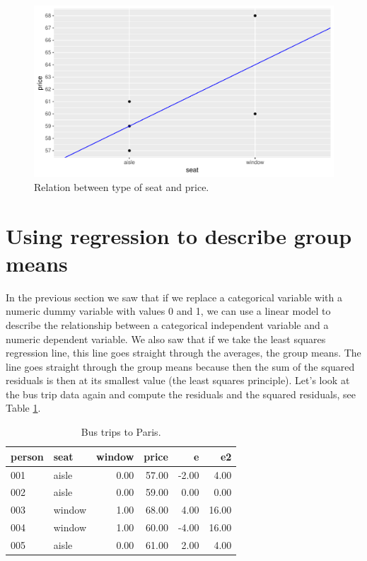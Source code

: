 \documentclass[]{report}\usepackage[]{graphicx}\usepackage[]{color}
\makeatletter
\def\maxwidth{ %
  \ifdim\Gin@nat@width>\linewidth
    \linewidth
  \else
    \Gin@nat@width
  \fi
}
\newenvironment{knitrout}{}{} %
\makeatother
\begin{document}
\begin{knitrout}
\color{fgcolor}\begin{figure}

{\centering \includegraphics[width=\maxwidth]{figure/dummy_4-1} 

}

\caption[Relation between type of seat and price]{Relation between type of seat and price.}\label{fig:dummy_4}
\end{figure}


\end{knitrout}



\section{Using regression to describe group means}

In the previous section we saw that if we replace a categorical variable with a numeric dummy variable with values 0 and 1, we can use a linear model to describe the relationship between a categorical independent variable and a numeric dependent variable. We also saw that if we take the least squares regression line, this line goes straight through the averages, the group means. The line goes straight through the group means because then the sum of the squared residuals is then at its smallest value (the least squares principle).  Let's look at the bus trip data again and compute the residuals and the squared residuals, see Table \ref{tab:dummy_5}.

\begin{table}[ht]
\centering
\caption{Bus trips to Paris.} 
\label{tab:dummy_5}
\begin{tabular}{llrrrr}
  \hline
person & seat & window & price & e & e2 \\ 
  \hline
001 & aisle & 0.00 & 57.00 & -2.00 & 4.00 \\ 
  002 & aisle & 0.00 & 59.00 & 0.00 & 0.00 \\ 
  003 & window & 1.00 & 68.00 & 4.00 & 16.00 \\ 
  004 & window & 1.00 & 60.00 & -4.00 & 16.00 \\ 
  005 & aisle & 0.00 & 61.00 & 2.00 & 4.00 \\ 
   \hline
\end{tabular}
\end{table}
\end{document}
